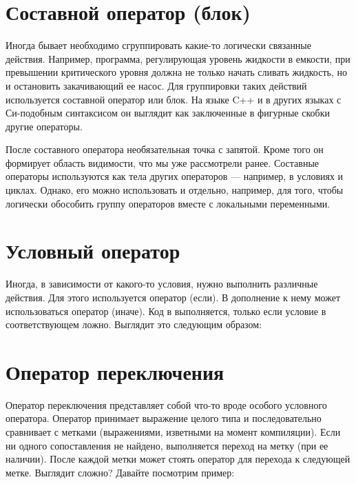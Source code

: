 \documentclass[book.tex]{subfiles}
\begin{document}



\maketitle 

\section*{Составной оператор (блок)}

Иногда бывает необходимо сгруппировать какие-то логически связанные действия. Например, программа, регулирующая уровень жидкости в емкости, при превышении критического уровня должна не только начать сливать жидкость, но и остановить закачивающий ее насос. Для группировки таких действий используется составной оператор или блок. На языке C++ и в других языках с Си-подобным синтаксисом он выглядит как заключенные в фигурные скобки \cppword{\{\}} другие операторы.

После составного оператора необязательная точка с запятой. Кроме того он формирует область видимости, что мы уже рассмотрели ранее. Составные операторы используются как тела других операторов --- например, в условиях и циклах. Однако, его можно использовать и отдельно, например, для того, чтобы логически обособить группу операторов вместе с локальными переменными.

\section*{Условный оператор}

Иногда, в зависимости от какого-то условия, нужно выполнить различные действия. Для этого используется оператор  (если). В дополнение к нему может использоваться оператор  (иначе). Код в  выполняется, только если условие в соответствующем  ложно. Выглядит это следующим образом:


\section*{Оператор переключения}

Оператор переключения  представляет собой что-то вроде особого условного оператора. Оператор принимает выражение целого типа и последовательно сравнивает с метками (выражениями, изветными на момент компиляции). Если ни одного сопоставления не найдено, выполняется переход на метку  (при ее наличии). После каждой метки может стоять оператор  для перехода к следующей метке. Выглядит сложно? Давайте посмотрим пример:
\end{document}
